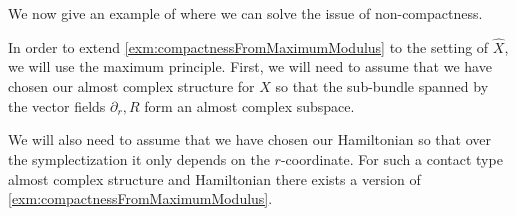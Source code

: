 We now give an example of where we can solve the issue of non-compactness.

In order to extend \cref{exm:compactnessFromMaximumModulus} to the setting of $\hat X$, we will use the maximum principle. First, we will need to assume that we have chosen our almost complex structure for $\hat X$ so that the sub-bundle spanned by the vector fields $\partial_r, R$ form an almost complex subspace.

We will also need to assume that we have chosen our Hamiltonian so that over the symplectization it only depends on the $r$-coordinate.
For such a contact type almost complex structure and Hamiltonian there exists a version of \cref{exm:compactnessFromMaximumModulus}.

